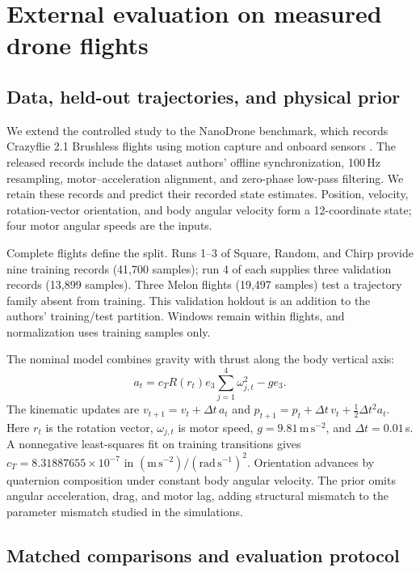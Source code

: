 \section{External evaluation on measured drone flights}
\label{sec:external}

\subsection{Data, held-out trajectories, and physical prior}

We extend the controlled study to the NanoDrone benchmark, which records
Crazyflie 2.1 Brushless flights using motion capture and onboard sensors
\cite{busetto2026_nanodrone}. The released records include the dataset authors'
offline synchronization, 100\,Hz resampling, motor--acceleration alignment,
and zero-phase low-pass filtering. We retain these records and predict their
recorded state estimates. Position, velocity, rotation-vector orientation,
and body angular velocity form a 12-coordinate state; four motor angular
speeds are the inputs.

Complete flights define the split. Runs 1--3 of Square, Random, and Chirp
provide nine training records (41,700 samples); run 4 of each supplies three
validation records (13,899 samples). Three Melon flights (19,497 samples)
test a trajectory family absent from training. This validation holdout is an
addition to the authors' training/test partition. Windows remain within
flights, and normalization uses training samples only.

The nominal model combines gravity with thrust along the body vertical axis:
\begin{equation}
 a_t=c_T R(r_t)e_3\sum_{j=1}^{4}\omega_{j,t}^{2}-g e_3.
 \label{eq:flight-prior}
\end{equation}
The kinematic updates are
$v_{t+1}=v_t+\Delta t\,a_t$ and
$p_{t+1}=p_t+\Delta t\,v_t+\tfrac12\Delta t^2a_t$.
Here $r_t$ is the rotation vector, $\omega_{j,t}$ is motor speed,
$g=9.81\,\mathrm{m\,s^{-2}}$, and $\Delta t=0.01$\,s. A nonnegative
least-squares fit on training transitions gives
$c_T=8.31887655\times10^{-7}$ in
$(\mathrm{m\,s^{-2}})/(\mathrm{rad\,s^{-1}})^2$.
Orientation advances by quaternion composition under constant body angular
velocity. The prior omits angular acceleration, drag, and motor lag, adding
structural mismatch to the parameter mismatch studied in the simulations.

\subsection{Matched comparisons and evaluation protocol}

